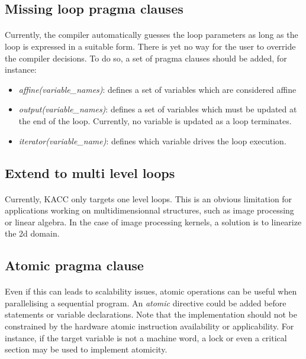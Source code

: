 \documentclass[a4paper, 11pt]{article}
\begin{document}
\subsection{Missing loop pragma clauses}
\paragraph{}
Currently, the compiler automatically guesses the loop parameters as long as the loop
is expressed in a suitable form. There is yet no way for the user to override the compiler
decisions. To do so, a set of pragma clauses should be added, for instance:
\begin{itemize}
  \item \textit{affine(variable\_names)}: defines a set of variables which are considered affine
  \item \textit{output(variable\_names)}: defines a set of variables which must be updated at the
    end of the loop. Currently, no variable is updated as a loop terminates.
  \item \textit{iterator(variable\_name)}: defines which variable drives the loop execution.
\end{itemize}

\subsection{Extend to multi level loops}
\paragraph{}
Currently, KACC only targets one level loops. This is an obvious limitation for applications
working on multidimensionnal structures, such as image processing or linear algebra. In the
case of image processing kernels, a solution is to linearize the 2d domain.

\subsection{Atomic pragma clause}
\paragraph{}
Even if this can leads to scalability issues, atomic operations can be useful when
parallelising a sequential program. An \textit{atomic} directive could be added before
statements or variable declarations. Note that the implementation should not be constrained
by the hardware atomic instruction availability or applicability. For instance, if the target
variable is not a machine word, a lock or even a critical section may be used to implement
atomicity.
\end{document}
